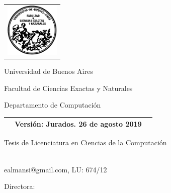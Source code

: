 \newcommand{\HRule}{\rule{\linewidth}{0.2mm}}
%
\thispagestyle{empty}

\begin{center}\leavevmode

\vspace{-2cm}

\begin{tabular}{l}
\includegraphics[width=2.6cm]{logofcen.pdf}
\end{tabular}


{\large \sc Universidad de Buenos Aires

Facultad de Ciencias Exactas y Naturales

Departamento de Computaci\'on}

\vspace{3.0cm}

{
\Large
\begin{tabular}{|p{2cm}cp{2cm}|}
\hline
& Versión: Jurados. 26 de agosto 2019 &\\
\hline
\end{tabular}
}

\vspace{2.0cm}

\begin{huge}
\textbf{\tituloTesis}
\end{huge}

\vspace{2cm}

{\large Tesis de Licenciatura en Ciencias de la Computaci\'on}

\vspace{1cm}

{
  \Large \autor \\
  \small ealmansi@gmail.com, LU: 674/12
}

\end{center}

\vfill

{\large

{Directora: \director}

\vspace{.2cm}

\lugar
}

\newpage\thispagestyle{empty}
